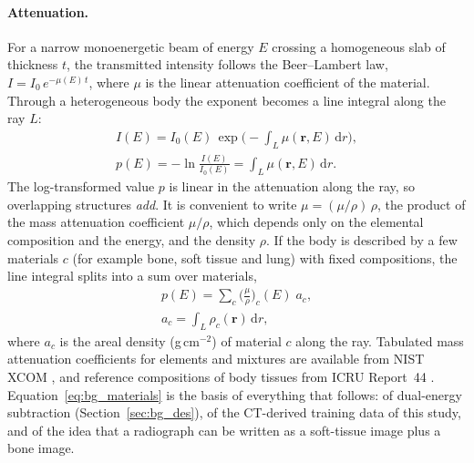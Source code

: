 \paragraph{Attenuation.} For a narrow monoenergetic beam of energy $E$ crossing a homogeneous slab of thickness $t$, the transmitted intensity
follows the Beer--Lambert law, $I=I_0\,e^{-\mu(E)\,t}$, where $\mu$ is the linear attenuation coefficient of the material. Through a
heterogeneous body the exponent becomes a line integral along the ray $L$:
\begin{equation}
\begin{gathered}
I(E)=I_0(E)\,\exp\!\Big(-\int_L \mu(\mathbf{r},E)\,\mathrm{d}r\Big),\\
p(E)=-\ln\frac{I(E)}{I_0(E)}=\int_L \mu(\mathbf{r},E)\,\mathrm{d}r .
\end{gathered}
\label{eq:bg_beerlambert}
\end{equation}
The log-transformed value $p$ is linear in the attenuation along the ray, so overlapping structures \emph{add}. It is convenient to write
$\mu=(\mu/\rho)\,\rho$, the product of the mass attenuation coefficient $\mu/\rho$, which depends only on the elemental composition and the
energy, and the density $\rho$. If the body is described by a few materials $c$ (for example bone, soft tissue and lung) with fixed compositions,
the line integral splits into a sum over materials,
\begin{equation}
\begin{gathered}
p(E)=\sum_c \Big(\frac{\mu}{\rho}\Big)_{\!c}(E)\;a_c,\\
a_c=\int_L \rho_c(\mathbf{r})\,\mathrm{d}r ,
\end{gathered}
\label{eq:bg_materials}
\end{equation}
where $a_c$ is the areal density (g\,cm$^{-2}$) of material $c$ along the ray. Tabulated mass attenuation coefficients for elements and mixtures
are available from NIST XCOM \citep{berger2010xcom}, and reference compositions of body tissues from ICRU Report~44 \citep{icru1989report44}.
Equation~\eqref{eq:bg_materials} is the basis of everything that follows: of dual-energy subtraction (Section~\ref{sec:bg_des}), of the
CT-derived training data of this study, and of the idea that a radiograph can be written as a soft-tissue image plus a bone image.

